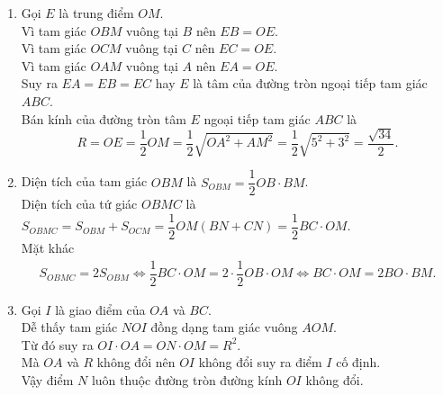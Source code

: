 \begin{bt}
{\begin{enumerate}
   Vậy $MC$ là tiếp tuyến của $(O)$.
   \item Gọi $E$ là trung điểm $OM$.\\
   Vì tam giác $OBM$ vuông tại $B$ nên $EB=OE$.\\
   Vì tam giác $OCM$ vuông tại $C$ nên $EC=OE$.\\
   Vì tam giác $OAM$ vuông tại $A$ nên $EA=OE$.\\
   Suy ra $EA=EB=EC$ hay $E$ là tâm của đường tròn ngoại tiếp tam giác $ABC$.\\
   Bán kính của đường tròn tâm $E$ ngoại tiếp tam giác $ABC$ là $$R=OE=\dfrac{1}{2}OM = \dfrac{1}{2}\sqrt{OA^2+AM^2} = \dfrac{1}{2}\sqrt{5^2+3^2} = \dfrac{\sqrt{34}}{2}.$$
   \item Diện tích của tam giác $OBM$ là $S_{OBM}=\dfrac{1}{2}OB \cdot BM$.\\
   Diện tích của tứ giác $OBMC$ là $S_{OBMC}=S_{OBM}+S_{OCM} = \dfrac{1}{2}OM(BN+CN)=\dfrac{1}{2}BC \cdot OM$.\\
   Mặt khác
   \begin{eqnarray*}
    S_{OBMC} = 2S_{OBM} \Leftrightarrow \dfrac{1}{2}BC \cdot OM = 2 \cdot \dfrac{1}{2}OB \cdot OM \Leftrightarrow BC \cdot OM = 2BO \cdot BM.
   \end{eqnarray*}
   \item Gọi $I$ là giao điểm của $OA$ và $BC$.\\
   Dễ thấy tam giác $NOI$ đồng dạng tam giác vuông $AOM$.\\
   Từ đó suy ra $OI \cdot OA = ON \cdot OM = R^2$.\\
   Mà $OA$ và $R$ không đổi nên $OI$ không đổi suy ra điểm $I$ cố định.\\
   Vậy điểm $N$ luôn thuộc đường tròn đường kính $OI$ không đổi.
  \end{enumerate}
  }
\end{bt}

